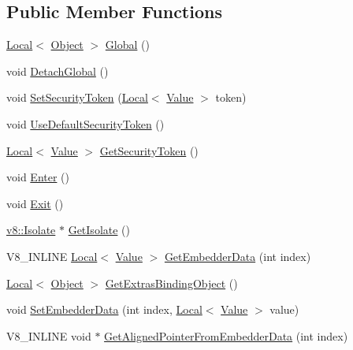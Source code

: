 \subsection*{Public Member Functions}
\begin{DoxyCompactItemize}
\item 
\hyperlink{classv8_1_1_local}{Local}$<$ \hyperlink{classv8_1_1_object}{Object} $>$ \hyperlink{classv8_1_1_context_aa4cef79528eabe1dd238752095d769cf}{Global} ()
\item 
void \hyperlink{classv8_1_1_context_a841c7dd92eb8c57df92a268a164dea97}{Detach\+Global} ()
\item 
void \hyperlink{classv8_1_1_context_a2351d9bdf4450d5f23734033289ba3ab}{Set\+Security\+Token} (\hyperlink{classv8_1_1_local}{Local}$<$ \hyperlink{classv8_1_1_value}{Value} $>$ token)
\item 
void \hyperlink{classv8_1_1_context_aa9e1a14982b64fd51ab87600a287bad2}{Use\+Default\+Security\+Token} ()
\item 
\hyperlink{classv8_1_1_local}{Local}$<$ \hyperlink{classv8_1_1_value}{Value} $>$ \hyperlink{classv8_1_1_context_a82990c1621f1e825db5832f668caabfd}{Get\+Security\+Token} ()
\item 
void \hyperlink{classv8_1_1_context_a6995c49d9897eb49053f07874b825133}{Enter} ()
\item 
void \hyperlink{classv8_1_1_context_a2db09d4fefb26023a40d88972a4c1599}{Exit} ()
\item 
\hyperlink{classv8_1_1_isolate}{v8\+::\+Isolate} $\ast$ \hyperlink{classv8_1_1_context_a8d3a502035994efc9f26f2f15638c1c0}{Get\+Isolate} ()
\item 
V8\+\_\+\+I\+N\+L\+I\+NE \hyperlink{classv8_1_1_local}{Local}$<$ \hyperlink{classv8_1_1_value}{Value} $>$ \hyperlink{classv8_1_1_context_a9cfafe0ac56f6aee17eb80a913489296}{Get\+Embedder\+Data} (int index)
\item 
\hyperlink{classv8_1_1_local}{Local}$<$ \hyperlink{classv8_1_1_object}{Object} $>$ \hyperlink{classv8_1_1_context_aa26f7db81111d908492327a1e254b232}{Get\+Extras\+Binding\+Object} ()
\item 
void \hyperlink{classv8_1_1_context_a1f2f3da0b9c3d9b68a5384b757d607d2}{Set\+Embedder\+Data} (int index, \hyperlink{classv8_1_1_local}{Local}$<$ \hyperlink{classv8_1_1_value}{Value} $>$ value)
\item 
V8\+\_\+\+I\+N\+L\+I\+NE void $\ast$ \hyperlink{classv8_1_1_context_aa3b5c1a1a5d145c6096840898013f559}{Get\+Aligned\+Pointer\+From\+Embedder\+Data} (int index)
\item 

\end{DoxyCompactItemize}
